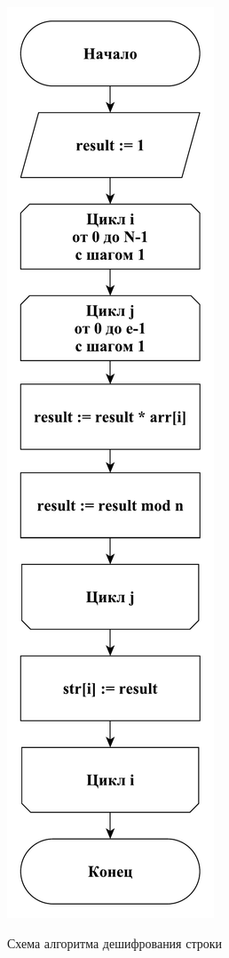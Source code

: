 \documentclass[a4paper,12pt]{article}
\begin{document}
\begin{figure}[h!]
    \begin{center}
    		{\includegraphics[scale = 0.5]{diagram/rsa3.pdf}}
       		\caption{Схема алгоритма дешифрования строки }
       		\label{fig:s3}
	\end{center}
\end{figure}
\newpage
	
\end{document}
